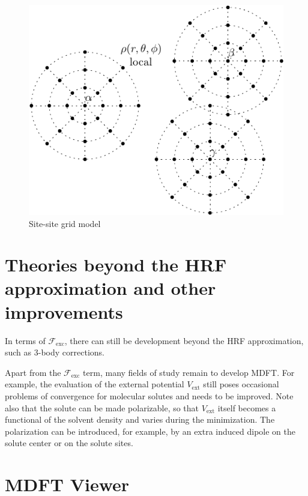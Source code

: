 \begin{figure}[h]
\begin{centering}
\includegraphics{_figure/site-site}
\par\end{centering}
\caption{Site-site grid model\label{fig:Site-site-grid-model}}
\end{figure}


\section{Theories beyond the HRF approximation and other improvements}

In terms of $\mathcal{F}_{\mathrm{exc}}$, there can still be development
beyond the \acs{HRF} approximation, such as 3-body corrections.

Apart from the $\mathcal{F}_{\mathrm{exc}}$ term, many fields of study 
remain to develop \acs{MDFT}. For example, the evaluation
of the external potential $V_{\mathrm{ext}}$ still poses occasional
problems of convergence for molecular solutes and needs to be improved.
Note also that the solute can be made polarizable, so that $V_{\mathrm{ext}}$
itself becomes a functional of the solvent density and varies during
the minimization. The polarization can be introduced, for example,
by an extra induced dipole on the solute center or on the solute sites.

\section{MDFT Viewer}

